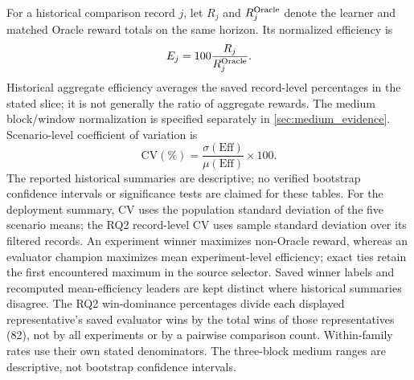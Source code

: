 For a historical comparison record $j$, let $R_j$ and $R_j^{\rm Oracle}$ denote the learner and matched Oracle reward totals on the same horizon. Its normalized efficiency is
\[
E_j=100\frac{R_j}{R_j^{\rm Oracle}}.
\]
Historical aggregate efficiency averages the saved record-level percentages in the stated slice; it is not generally the ratio of aggregate rewards. The medium block/window normalization is specified separately in \cref{sec:medium_evidence}. Scenario-level coefficient of variation is
\[
\mathrm{CV}(\%)=\frac{\sigma(\mathrm{Eff})}{\mu(\mathrm{Eff})}\times100.
\]
The reported historical summaries are descriptive; no verified bootstrap confidence intervals or significance tests are claimed for these tables. For the deployment summary, CV uses the population standard deviation of the five scenario means; the RQ2 record-level CV uses sample standard deviation over its filtered records. An experiment winner maximizes non-Oracle reward, whereas an evaluator champion maximizes mean experiment-level efficiency; exact ties retain the first encountered maximum in the source selector. Saved winner labels and recomputed mean-efficiency leaders are kept distinct where historical summaries disagree. The RQ2 win-dominance percentages divide each displayed representative's saved evaluator wins by the total wins of those representatives (82), not by all experiments or by a pairwise comparison count. Within-family rates use their own stated denominators. The three-block medium ranges are descriptive, not bootstrap confidence intervals.
